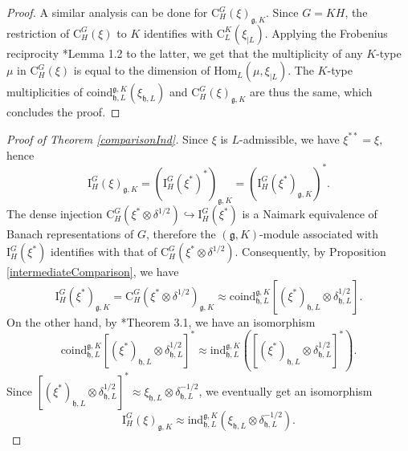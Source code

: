 \documentclass{amsart}
\theoremstyle{definition}
\begin{document}
\begin{proof}
    A similar analysis can be done for $\mathrm{C}_H^G(\xi)_{\mathfrak{g},K}$. Since $G = KH$, the restriction of $\mathrm{C}_H^G(\xi)$ to $K$ identifies with $\mathrm{C}_L^K(\xi_{|L})$. Applying the Frobenius reciprocity \cite{vandenBan}*{Lemma 1.2} to the latter, we get that the multiplicity of any $K$-type $\mu$ in $\mathrm{C}_H^G(\xi)$ is equal to the dimension of $\mathrm{Hom}_L(\mu, \xi_{|L})$. The $K$-type multiplicities of $\text{coind}_{\mathfrak{h},L}^{\mathfrak{g},K}(\xi_{\mathfrak{h},L} )$ and $\mathrm{C}_H^G(\xi)_{\mathfrak{g},K}$ are thus the same, which concludes the proof.
\end{proof}

\begin{proof}[Proof of Theorem \ref{comparisonInd}]
    Since $\xi$ is $L$-admissible, we have $\xi^{**}= \xi$, hence \[\mathrm{I}_H^G(\xi)_{\mathfrak{g},K} = (\mathrm{I}_H^G(\xi^*)^*)_{\mathfrak{g},K} = (\mathrm{I}_H^G(\xi^*)_{\mathfrak{g},K})^*.\]
    The dense injection $\mathrm{C}_H^G(\xi^* \otimes \delta^{1/2}) \hookrightarrow \mathrm{I}_H^G(\xi^*)$ is a Naimark equivalence of Banach representations of $G$, therefore the $(\mathfrak{g},K)$-module associated with $\mathrm{I}_H^G(\xi^*)$ identifies with that of $\mathrm{C}_H^G(\xi^* \otimes \delta^{1/2})$. Consequently, by Proposition \ref{intermediateComparison}, we have
    \[\mathrm{I}_H^G(\xi^*)_{\mathfrak{g},K} = \mathrm{C}_H^G(\xi^* \otimes \delta^{1/2})_{\mathfrak{g},K} \approx \mathrm{coind}^{\mathfrak{g},K}_{\mathfrak{h},L}\left[(\xi^*)_{\mathfrak{h},L} \otimes \delta^{1/2}_{\mathfrak{h},L}\right].\]
    On the other hand, by \cite{KnappVogan}*{Theorem 3.1}, we have an isomorphism
    \[\mathrm{coind}^{\mathfrak{g},K}_{\mathfrak{h},L}\left[(\xi^*)_{\mathfrak{h},L} \otimes \delta^{1/2}_{\mathfrak{h},L}\right]^* \approx \mathrm{ind}^{\mathfrak{g},K}_{\mathfrak{h},L}\left(\left[(\xi^*)_{\mathfrak{h},L} \otimes \delta^{1/2}_{\mathfrak{h},L}\right]^*\right).\]
    Since $\left[(\xi^*)_{\mathfrak{h},L} \otimes \delta^{1/2}_{\mathfrak{h},L}\right]^* \approx \xi_{\mathfrak{h},L} \otimes \delta^{-1/2}_{\mathfrak{h},L}$, we eventually get an isomorphism
    \[\mathrm{I}_H^G(\xi)_{\mathfrak{g},K}\approx \mathrm{ind}^{\mathfrak{g},K}_{\mathfrak{h},L}(\xi_{\mathfrak{h},L} \otimes \delta^{-1/2}_{\mathfrak{h},L}).\]
\end{proof}
\end{document}
